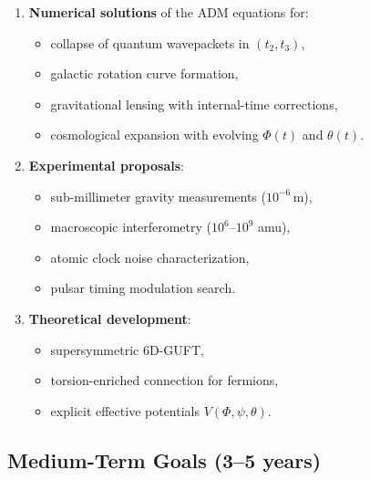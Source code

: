 \documentclass[12pt]{article}
\begin{document}
\begin{enumerate}
\item \textbf{Numerical solutions} of the ADM equations for:
\begin{itemize}
\item collapse of quantum wavepackets in \((t_2,t_3)\),
\item galactic rotation curve formation,
\item gravitational lensing with internal-time corrections,
\item cosmological expansion with evolving \(\Phi(t)\) and \(\theta(t)\).
\end{itemize}

\item \textbf{Experimental proposals}:
\begin{itemize}
\item sub-millimeter gravity measurements (\(10^{-6}\,\mathrm{m}\)),
\item macroscopic interferometry (\(10^6\)--\(10^9\) amu),
\item atomic clock noise characterization,
\item pulsar timing modulation search.
\end{itemize}

\item \textbf{Theoretical development}:
\begin{itemize}
\item supersymmetric 6D-GUFT,
\item torsion-enriched connection for fermions,
\item explicit effective potentials \(V(\Phi,\psi,\theta)\).
\end{itemize}
\end{enumerate}

\subsection{Medium-Term Goals (3--5 years)}
\end{document}
